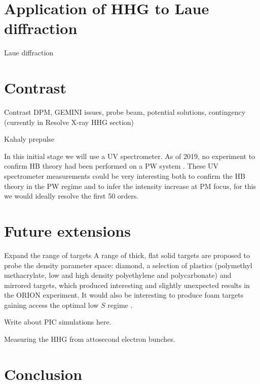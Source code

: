 \section{Application of HHG to Laue diffraction}
Laue diffraction



\section{Contrast}

Contrast DPM, GEMINI issues, probe beam, potential solutions, contingency (currently in Resolve X-ray HHG section)

Kahaly prepulse


In this initial stage we will use a UV spectrometer. As of 2019, no experiment to confirm HB theory had been performed on a PW system \cite{vincentiAchievingExtremeLight2019}. These UV spectrometer measurements could be very interesting both to confirm the HB theory in the PW regime and to infer the intensity increase at PM focus, for this we would ideally resolve the first 50 orders.


\section{Future extensions}

Expand the range of targets A range of thick, flat solid targets are proposed to probe the density parameter space: diamond, a selection of plastics (polymethyl methacrylate, low and high density polyethylene and polycarbonate) and mirrored targets, which produced interesting and slightly unexpected results in the ORION experiment. It would also be interesting to produce foam targets gaining access the optimal low $S$ regime \cite{bataniPhysicsIssuesShock2014}.

Write about PIC simulations here.

Measuring the HHG from attosecond electron bunches.


\section{Conclusion}







